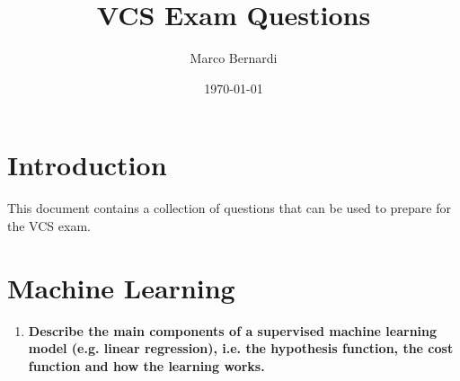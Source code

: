 \documentclass[12pt]{article}
\title{VCS Exam Questions}
\author{Marco Bernardi}
\date{\today}
\begin{document}
\maketitle

\section{Introduction}
This document contains a collection of questions that can be used to prepare for the VCS exam.
\section{Machine Learning}
\begin {enumerate}
\item \textbf{Describe the main components of a supervised machine learning model (e.g. linear regression),
    i.e. the hypothesis function, the cost function and how the learning works.}


\end{enumerate}
\end{document}

